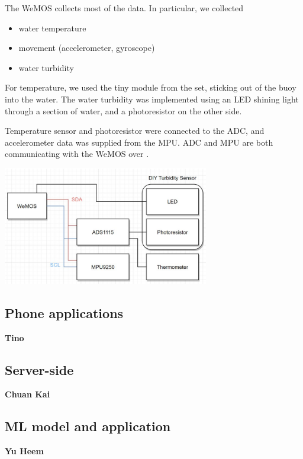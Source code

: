 \documentclass{article}
\begin{document}
\begin{multicols}{2}

The WeMOS collects most of the data. In particular, we collected

\begin{itemize}
    \item water temperature
    \item movement (accelerometer, gyroscope)
    \item water turbidity
\end{itemize}

For temperature, we used the tiny module from the set, sticking out of the buoy into the water. The water turbidity was implemented using an LED shining light through a section of water, and a photoresistor on the other side.

Temperature sensor and photoresistor were connected to the ADC, and accelerometer data was supplied from the MPU. ADC and MPU are both communicating with the WeMOS over \ISquaredC.

\includegraphics[width=9cm]{report/images/wiring.png}

\end{multicols}

\subsection{Phone applications}

\textbf{Tino}

\subsection{Server-side}

\textbf{Chuan Kai}

\subsection{ML model and application}

\textbf{Yu Heem}
\end{document}

